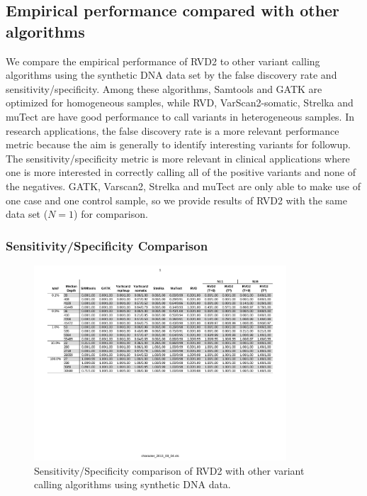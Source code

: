 \documentclass{bioinfo}
\begin{document}
\subsection{Empirical performance compared with other algorithms}\label{sec:comparison}

We compare the empirical performance of RVD2 to other variant calling algorithms using the synthetic DNA data set by the false discovery rate and sensitivity/specificity. Among these algorithms, Samtools and GATK are optimized for homogeneous samples, while RVD, VarScan2-somatic, Strelka and muTect are have good performance to call variants in heterogeneous samples. In research applications, the false discovery rate is a more relevant performance metric because the aim is generally to identify interesting variants for followup. The sensitivity/specificity metric is more relevant in clinical applications where one is more interested in correctly calling all of the positive variants and none of the negatives. GATK, Varscan2, Strelka and muTect are only able to make use of one case and one control sample, so we provide results of RVD2 with the same data set ($N=1$) for comparison.




\subsubsection*{Sensitivity/Specificity Comparison}

\begin{figure}[!htpb]
\centering
\vspace{-10pt}
\includegraphics[width=0.84\textwidth]{pdf_figs/comparison_table_ss.pdf}
\caption{Sensitivity/Specificity comparison of RVD2 with other variant calling algorithms using synthetic DNA data.}
\vspace{-10pt}
\label{tbl:comparison_ss}
\end{figure}
\end{document}
